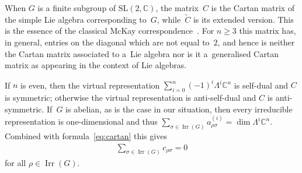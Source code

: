 \documentclass[10pt,a4paper]{amsart}
\numberwithin{equation}{section}
\newcommand{\C}{{\mathbb C}}
\newcommand{\SL}{\mathrm{SL}}
\newcommand{\Irr}{\operatorname{Irr}}
\begin{document}
\begin{Remark}
  When $G$ is a f\/inite subgroup of $\SL(2,\C)$, the matrix~$C$ is the
  Cartan matrix of the simple Lie algebra corresponding to~$G$, while~$\tilde{C}$ is its extended version.  This is the essence of the classical
  McKay correspondence~\cite{McKay1980}.  For $n\geq 3$ this matrix has, in general, entries on the diagonal which are not equal to~$2$, and hence is
  neither the Cartan matrix associated to a~Lie algebra nor is it a~generalised Cartan matrix as appearing in the context of Lie
  algebras.
\end{Remark}

If $n$ is even, then the virtual representation $\sum\limits_{i=0}^n(-1)^i
\Lambda^i \C^n$ is self-dual and $C$ is symmetric; otherwise the
virtual representation is anti-self-dual and $C$ is anti-symmetric.
If~$G$ is abelian, as is the case in our situation, then every
irreducible representation is one-dimensional and thus $\sum\limits_{\sigma
  \in \Irr(G)} a_{\rho\sigma}^{(i)} = \dim  \Lambda^i\C^n$.  Combined
with formula~\eqref{eq:cartan} this gives
\begin{gather}\label{eq:c}
  \sum_{\sigma \in \Irr(G)} c_{\rho\sigma} = 0
\end{gather}
for all $\rho \in \Irr(G)$.
\end{document}
